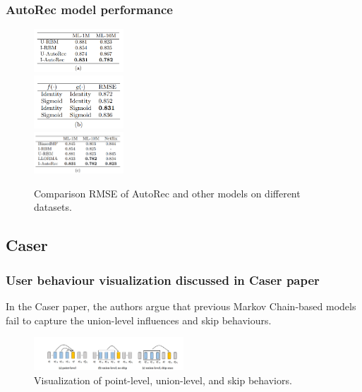 \documentclass{ieeetj}
\begin{document}
\subsubsection{AutoRec model performance}
\begin{figure}[h]
	\centering
	\includegraphics[width=0.3\textwidth]{figures/autorecresults1.png}\\
	\includegraphics[width=0.3\textwidth]{figures/autorecresults2.png}\\
	\includegraphics[width=0.3\textwidth]{figures/autorecresults3.png}
	\caption{Comparison RMSE of AutoRec and other models on different datasets.}	
	\label{fig:autorec_performance}
\end{figure}

\FloatBarrier
\subsection{Caser}
\subsubsection{User behaviour visualization discussed in Caser paper}
In the Caser paper, the authors argue that previous Markov Chain-based models fail to capture the union-level influences and skip behaviours. 
\begin{figure}[h]
\centering
\includegraphics[width=0.5\textwidth]{figures/caser-behaviour.png}
\caption{Visualization of point-level, union-level, and skip behaviors.}
\label{fig:caser-behaviour}
\label{fig:caser1}
\end{figure}
\end{document}

